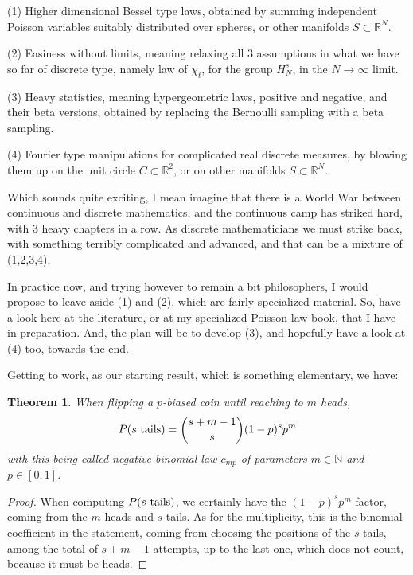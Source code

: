 \documentclass[12pt]{amsbook}
\newtheorem{theorem}{Theorem}[chapter]
\begin{document}
\bigskip

(1) Higher dimensional Bessel type laws, obtained by summing independent Poisson variables suitably distributed over spheres, or other manifolds $S\subset\mathbb R^N$.

\bigskip

(2) Easiness without limits, meaning relaxing all 3 assumptions in what we have so far of discrete type, namely law of $\chi_t$, for the group $H_N^s$, in the $N\to\infty$ limit. 

\bigskip

(3) Heavy statistics, meaning hypergeometric laws, positive and negative, and their beta versions, obtained by replacing the Bernoulli sampling with a beta sampling.

\bigskip

(4) Fourier type manipulations for complicated real discrete measures, by blowing them up on the unit circle $C\subset\mathbb R^2$, or on other manifolds $S\subset\mathbb R^N$.

\bigskip

Which sounds quite exciting, I mean imagine that there is a World War between continuous and discrete mathematics, and the continuous camp has striked hard, with 3 heavy chapters in a row. As discrete mathematicians we must strike back, with something terribly complicated and advanced, and that can be a mixture of (1,2,3,4).

\bigskip 

In practice now, and trying however to remain a bit philosophers, I would propose to leave aside (1) and (2), which are fairly specialized material. So, have a look here at the literature, or at my specialized Poisson law book, that I have in preparation. And, the plan will be to develop (3), and hopefully have a look at (4) too, towards the end. 

\bigskip

Getting to work, as our starting result, which is something elementary, we have:

\begin{theorem}
When flipping a $p$-biased coin until reaching to $m$ heads,
$$P(s\ {\rm tails})=\binom{s+m-1}{s}(1-p)^sp^m$$
with this being called negative binomial law $c_{mp}$ of parameters $m\in\mathbb N$ and $p\in[0,1]$.
\end{theorem}

\begin{proof}
When computing $P(s\ {\rm tails})$, we certainly have the $(1-p)^sp^m$ factor, coming from the $m$ heads and $s$ tails. As for the multiplicity, this is the binomial coefficient in the statement, coming from choosing the positions of the $s$ tails, among the total of $s+m-1$ attempts, up to the last one, which does not count, because it must be heads. 
\end{proof}
\end{document}
